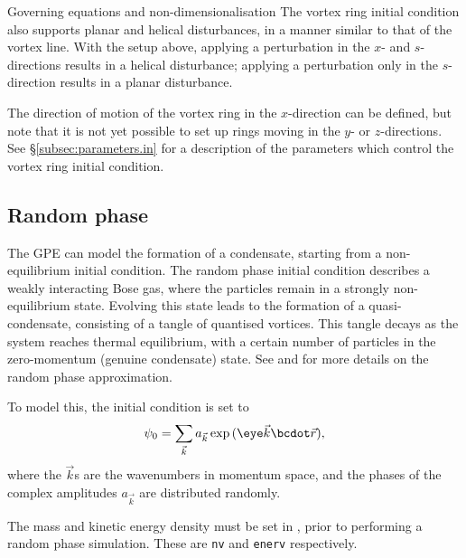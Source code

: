 \begin{chapter}{\label{cha:equations}Governing equations and
  non-dimensionalisation}
  The vortex ring initial condition also supports planar and helical
  disturbances, in a manner similar to that of the vortex line.  With the setup
  above, applying a perturbation in the $x$- and $s$-directions results in a
  helical disturbance; applying a perturbation only in the $s$-direction
  results in a planar disturbance.

  The direction of motion of the vortex ring in the $x$-direction can be
  defined, but note that it is not yet possible to set up rings moving in the
  $y$- or $z$-directions.  See \S\ref{subsec:parameters.in} for a description
  of the parameters which control the vortex ring initial condition.

  \subsection{Random phase}
  The GPE can model the formation of a condensate, starting from a
  non-equilibrium initial condition.  The random phase initial condition
  describes a weakly interacting Bose gas, where the particles remain in a
  strongly non-equilibrium state.  Evolving this state leads to the formation
  of a quasi-condensate, consisting of a tangle of quantised vortices.  This
  tangle decays as the system reaches thermal equilibrium, with a certain
  number of particles in the zero-momentum (genuine condensate) state.  See
  \citet{BS02} and \citet{CJPPR05} for more details on the random phase
  approximation.

  To model this, the initial condition is set to
  \begin{equation*}
    \psi_{0} = \sum_{\vec{k}} a_{\vec{k}} \exp{(\eye\vec{k}\bcdot\vec{r})},
  \end{equation*}
  where the $\vec{k}$s are the wavenumbers in momentum space, and the phases of
  the complex amplitudes $a_{\vec{k}}$ are distributed randomly.

  The mass and kinetic energy density must be set in , prior to
  performing a random phase simulation.  These are \verb"nv" and \verb"enerv"
  respectively.

\end{chapter}
